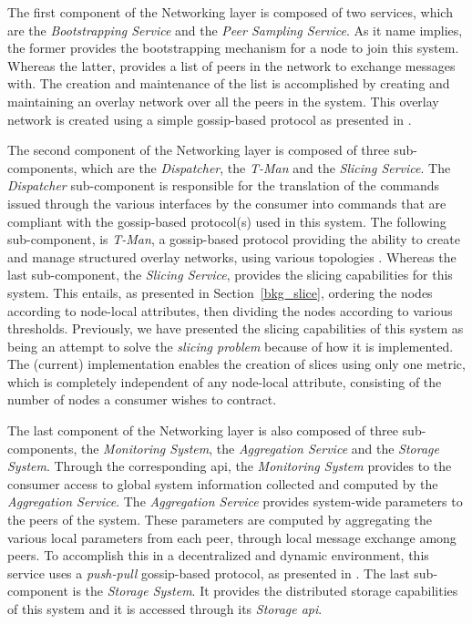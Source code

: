 \documentclass[12pt, titlepage]{uo_temp}
\begin{document}
     The first component of the Networking layer is composed of two services, which are
     the \emph{Bootstrapping Service} and the \emph{Peer Sampling Service}. As it name
     implies, the former provides the bootstrapping mechanism for a node to join this
     system. Whereas the latter, provides a list of peers in the network to exchange
     messages with. The creation and maintenance of the list is accomplished by creating
     and maintaining an overlay network over all the peers in the system. This overlay
     network is created using a simple gossip-based protocol as presented in
     \cite{pss}.

     The second component of the Networking layer is composed of three sub-components,
     which are the \emph{Dispatcher}, the \emph{T-Man} and the \emph{Slicing Service}. The
     \emph{Dispatcher} sub-component is responsible for the translation of the commands
     issued through the various interfaces by the consumer into commands that are
     compliant with the gossip-based protocol(s) used in this system. The following
     sub-component, is \emph{T-Man}, a gossip-based protocol providing the ability to
     create and manage structured overlay networks, using various topologies
     \cite{jelasity2009t}. Whereas the last sub-component, the \emph{Slicing Service},
     provides the slicing capabilities for this system. This entails, as presented in
     Section~\ref{bkg_slice}, ordering the nodes according to node-local attributes, then
     dividing the nodes according to various thresholds. Previously, we have presented the
     slicing capabilities of this system as being an attempt to solve the \emph{slicing
       problem} because of how it is implemented. The (current) implementation enables the
     creation of slices using only one metric, which is completely independent of any
     node-local attribute, consisting of the number of nodes a consumer wishes to
     contract.

     The last component of the Networking layer is also composed of three sub-components,
     the \emph{Monitoring System}, the \emph{Aggregation Service} and the \emph{Storage
       System}. Through the corresponding \gls{api}, the \emph{Monitoring System} provides
     to the consumer access to global system information collected and computed by the
     \emph{Aggregation Service}. The \emph{Aggregation Service} provides system-wide
     parameters to the peers of the system. These parameters are computed by aggregating
     the various local parameters from each peer, through local message exchange among
     peers. To accomplish this in a decentralized and dynamic environment, this service
     uses a \emph{push-pull} gossip-based protocol, as presented in
     \cite{jelasity2005gossip}. The last sub-component is the \emph{Storage System}. It
     provides the distributed storage capabilities of this system and it is accessed
     through its \emph{Storage \gls{api}}.
\end{document}
